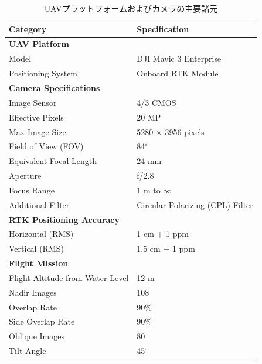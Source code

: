 \begin{table}[htbp]
  \centering
  \caption{UAVプラットフォームおよびカメラの主要諸元}
  \label{tab:drone-spec}
  \begin{tabular}{@{}ll@{}}

    \toprule
    \textbf{Category} & \textbf{Specification} \\
    
    \midrule
    \textbf{UAV Platform} & \\
    \quad Model & DJI Mavic 3 Enterprise \\
    \quad Positioning System & Onboard RTK Module \\
    
    \midrule
    \textbf{Camera Specifications} & \\
    \quad Image Sensor & 4/3 CMOS \\
    \quad Effective Pixels & 20 MP \\
    \quad Max Image Size & 5280 $\times$ 3956 pixels \\
    \quad Field of View (FOV) & 84$^\circ$ \\
    \quad Equivalent Focal Length & 24 mm \\
    \quad Aperture & f/2.8  \\ %
    \quad Focus Range & 1 m to $\infty$ \\
    \quad Additional Filter & Circular Polarizing (CPL) Filter \\
    
    \midrule
    \textbf{RTK Positioning Accuracy} & \\
    \quad Horizontal (RMS) & 1 cm + 1 ppm \\
    \quad Vertical (RMS) & 1.5 cm + 1 ppm \\

    \midrule
    \textbf{Flight Mission} & \\
    \quad Flight Altitude from Water Level & 12 m \\
    \quad Nadir Images & 108 \\
    \quad Overlap Rate & 90\% \\
    \quad Side Overlap Rate & 90\% \\
    \quad Oblique Images & 80 \\
    \quad Tilt Angle & 45$^\circ$ \\

    \bottomrule
  \end{tabular}
\end{table}


